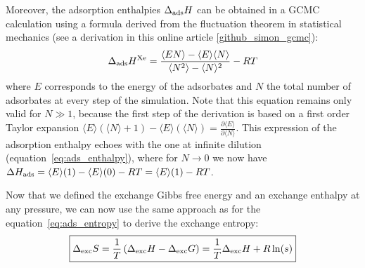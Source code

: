 \documentclass[main.tex]{subfiles}
\begin{document}
Moreover, the adsorption enthalpies $\Delta_{\text{ads}}H$ can be obtained in a GCMC calculation using a formula derived from the fluctuation theorem in statistical mechanics (see a derivation in this online article \ref{github_simon_gcmc}):
\begin{equation}\label{eq:ads_heat_gcmc}
  \Delta_{\text{ads}}H^{\text{Xe}} = \dfrac{\langle EN \rangle - \langle E \rangle\langle N \rangle}{\langle N^2 \rangle - \langle N \rangle^2} - RT
\end{equation}
where $E$ corresponds to the energy of the adsorbates and $N$ the total number of adsorbates at every step of the simulation. Note that this equation remains only valid for $N\gg1$, because the first step of the derivation is based on a first order Taylor expansion $\langle E \rangle(\langle N \rangle+1)-\langle E \rangle(\langle N \rangle) = \frac{\partial \langle E \rangle}{\partial \langle N \rangle}$. This expression of the adsorption enthalpy echoes with the one at infinite dilution (equation~\ref{eq:ads_enthalpy}), where for $N\rightarrow0$ we now have $\Delta H_{\text{ads}} = \langle E \rangle(1)-\langle E \rangle(0) - RT = \langle E \rangle(1) - RT$.

Now that we defined the exchange Gibbs free energy and an exchange enthalpy at any pressure, we can now use the same approach as for the equation~\ref{eq:ads_entropy} to derive the exchange entropy:
\begin{equation} \label{eqn:exc_entropy}
  \boxed{
  \Delta_{\text{exc}}S = \dfrac{1}{T}\left(\Delta_{\text{exc}}H - \Delta_{\text{exc}}G\right)= \dfrac{1}{T}\Delta_{\text{exc}}H + R\ln(s)
  }
\end{equation}
\end{document}
